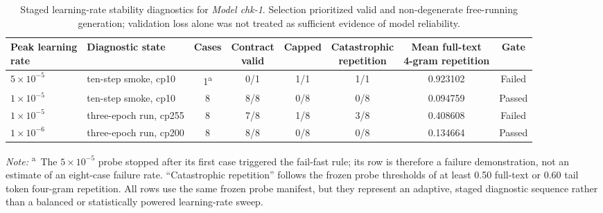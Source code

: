 \begin{table}[htbp]
    \centering
    \scriptsize
    \setlength{\tabcolsep}{3.5pt}
    \renewcommand{\arraystretch}{1.15}
    \begin{tabularx}{\textwidth}{@{}l>{\raggedright\arraybackslash}Xcccccc@{}}
        \toprule
        \makecell{\textbf{Peak learning}\\\textbf{rate}} &
        \textbf{Diagnostic state} &
        \textbf{Cases} &
        \makecell{\textbf{Contract}\\\textbf{valid}} &
        \textbf{Capped} &
        \makecell{\textbf{Catastrophic}\\\textbf{repetition}} &
        \makecell{\textbf{Mean full-text}\\\textbf{4-gram repetition}} &
        \textbf{Gate} \\
        \midrule
        \(5\times10^{-5}\) & ten-step smoke, cp10 & 1\textsuperscript{a} & 0/1 & 1/1 & 1/1 & 0.923102 & Failed \\
        \(1\times10^{-5}\) & ten-step smoke, cp10 & 8 & 8/8 & 0/8 & 0/8 & 0.094759 & Passed \\
        \(1\times10^{-5}\) & three-epoch run, cp255 & 8 & 7/8 & 1/8 & 3/8 & 0.408608 & Failed \\
        \(1\times10^{-6}\) & three-epoch run, cp200 & 8 & 8/8 & 0/8 & 0/8 & 0.134664 & Passed \\
        \bottomrule
    \end{tabularx}
    \begin{minipage}{0.96\textwidth}
        \vspace{2pt}
        \footnotesize
        \textit{Note:} \textsuperscript{a}\ The \(5\times10^{-5}\) probe stopped
        after its first case triggered the fail-fast rule; its row is therefore
        a failure demonstration, not an estimate of an eight-case failure rate.
        ``Catastrophic repetition'' follows the frozen probe thresholds of at
        least 0.50 full-text or 0.60 tail token four-gram repetition. All rows
        use the same frozen probe manifest, but they represent an adaptive,
        staged diagnostic sequence rather than a balanced or statistically
        powered learning-rate sweep.
    \end{minipage}
    \caption{Staged learning-rate stability diagnostics for \textit{Model
    chk-1}. Selection prioritized valid and non-degenerate free-running
    generation; validation loss alone was not treated as sufficient evidence
    of model reliability.}
    \label{tab:app:chk1_lr_stability}
\end{table}

